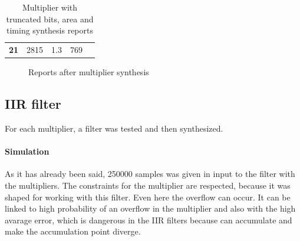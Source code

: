\documentclass[a4paper]{article}
\begin{document}
\begin{table}[hbtp]
\begin{tabular}{|c|c|c|c|l}
		\textbf{21}                                                                  & 		2815                                                                       & 		1.3                                                                        & 		769                                                                                  &  \\ \cline{1-4}
		\end{tabular}
		\caption{Multiplier with truncated bits, area and timing synthesis reports}
		\label{tab:mult_trunc_syn}
	\end{table}
	\begin{figure}[H]
		\centering
		\hfill
		\caption{Reports after multiplier synthesis}
	\end{figure}
	\subsection{IIR filter}
	For each multiplier, a filter was tested and then synthesized.

	\paragraph*{Simulation} As it has already been said, 250000 samples was given in input to the filter with the multipliers. The constraints for the multiplier are respected, because it was shaped for working with this filter.
	Even here the overflow can occur. It can be linked to high probability of an overflow in the multiplier and also with the high avarage error, which is dangerous in the IIR filters because can accumulate and make the accumulation point diverge.
\end{document}

